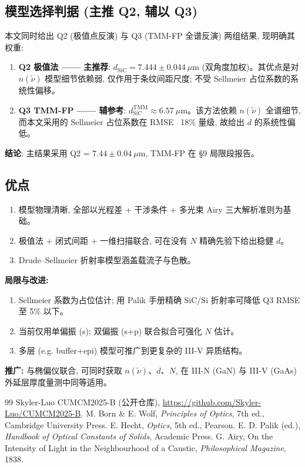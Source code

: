 \documentclass[UTF8,a4paper,12pt]{ctexart}
\begin{document}
\subsection{模型选择判据 (主推 Q2, 辅以 Q3)}

本文同时给出 Q2 (极值点反演) 与 Q3 (TMM-FP 全谱反演) 两组结果, 现明确其权重:
\begin{enumerate}
\item \textbf{Q2 极值法 —— 主推荐}: $d_\text{SiC} = 7.444 \pm 0.044~\mu$m (双角度加权)。其优点是对 $n(\tilde{\nu})$ 模型细节依赖弱, 仅作用于条纹间距尺度; 不受 Sellmeier 占位系数的系统性偏移。
\item \textbf{Q3 TMM-FP —— 辅参考}: $d_\text{SiC}^\text{TMM} \approx 6.57~\mu$m。该方法依赖 $n(\tilde{\nu})$ 全谱细节, 而本文采用的 Sellmeier 占位系数在 RMSE ~18\% 量级, 故给出 $d$ 的系统性偏低。
\end{enumerate}

\noindent \textbf{结论}: 主结果采用 Q2 = $7.44 \pm 0.04~\mu$m, TMM-FP 在 §9 局限段报告。

\subsection{优点}
\begin{enumerate}
\item 模型物理清晰, 全部以光程差 + 干涉条件 + 多光束 Airy 三大解析准则为基础。
\item 极值法 + 闭式间距 + 一维扫描联合, 可在没有 $N$ 精确先验下给出稳健 $d$。
\item Drude--Sellmeier 折射率模型涵盖载流子与色散。
\end{enumerate}

\textbf{局限与改进:}
\begin{enumerate}
\item Sellmeier 系数为占位估计; 用 Palik 手册精确 SiC/Si 折射率可降低 Q3 RMSE 至 5\% 以下。
\item 当前仅用单偏振 (s); 双偏振 (s+p) 联合拟合可强化 $N$ 估计。
\item 多层 (e.g. buffer+epi) 模型可推广到更复杂的 III-V 异质结构。
\end{enumerate}

\textbf{推广:} 与椭偏仪联合, 可同时获取 $n(\tilde{\nu})$、$d$、$N$, 在 III-N (GaN) 与 III-V (GaAs) 外延层厚度量测中同等适用。

\begin{thebibliography}{99}
 Skyler-Luo CUMCM2025-B (公开仓库), \url{https://github.com/Skyler-Luo/CUMCM2025-B}.
 M. Born \& E. Wolf, \textit{Principles of Optics}, 7th ed., Cambridge University Press.
 E. Hecht, \textit{Optics}, 5th ed., Pearson.
 E. D. Palik (ed.), \textit{Handbook of Optical Constants of Solids}, Academic Press.
 G. Airy, On the Intensity of Light in the Neighbourhood of a Caustic, \textit{Philosophical Magazine}, 1838.
\end{thebibliography}
\end{document}
